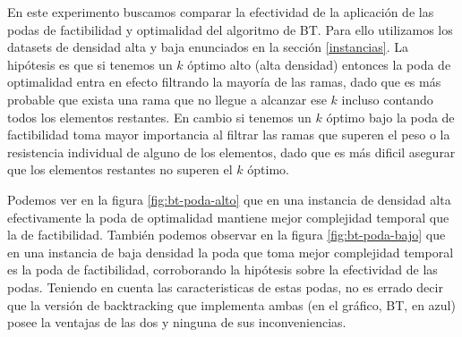\documentclass[10pt,a4paper]{article}
\begin{document}
En este experimento buscamos comparar la efectividad de la aplicación de las podas de factibilidad y optimalidad del algoritmo de BT. Para ello utilizamos los datasets de densidad alta y baja enunciados en la sección \ref{instancias}. La hipótesis es que si tenemos un $k$ óptimo alto (alta densidad) entonces la poda de optimalidad entra en efecto filtrando la mayoría de las ramas, dado que es más probable que exista una rama que no llegue a alcanzar ese $k$ incluso contando todos los elementos restantes. En cambio si tenemos un $k$ óptimo bajo la poda de factibilidad toma mayor importancia al filtrar las ramas que superen el peso o la resistencia individual de alguno de los elementos, dado que es más dificil asegurar que los elementos restantes no superen el $k$ óptimo.

Podemos ver en la figura \ref{fig:bt-poda-alto} que en una instancia de densidad alta efectivamente la poda de optimalidad mantiene mejor complejidad temporal que la de factibilidad. También podemos observar en la figura \ref{fig:bt-poda-bajo} que en una instancia de baja densidad la poda que toma mejor complejidad temporal es la poda de factibilidad, corroborando la hipótesis sobre la efectividad de las podas.
Teniendo en cuenta las caracteristicas de estas podas, no es errado decir que la versión de backtracking que implementa ambas (en el gráfico, BT, en azul) posee la ventajas de las dos y ninguna de sus inconveniencias.

\newpage
\end{document}
